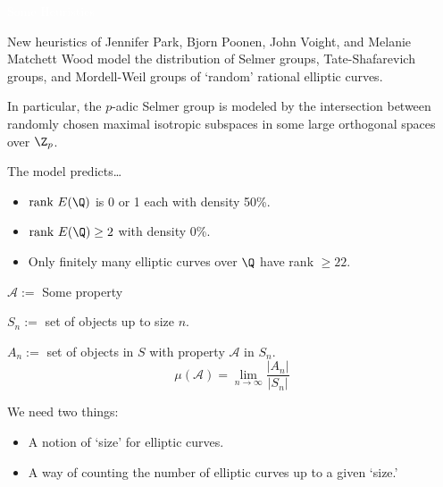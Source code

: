 \begin{frame}{\textcolor{white}{Some Heuristics}}

New heuristics of Jennifer Park, Bjorn Poonen, John Voight, and Melanie Matchett Wood model the distribution of Selmer groups, Tate-Shafarevich groups, and Mordell-Weil groups of `random' rational elliptic curves. \pause \par\vspace{0.3cm}

In particular, the $p$-adic Selmer group is modeled by the intersection between randomly chosen maximal isotropic subspaces in some large orthogonal spaces over $\Z_p$. \pause \par\vspace{0.3cm}

The model predicts\dots \pause
        \begin{itemize}
        \item $\text{rank } E(\Q)$ is 0 or 1 each with density 50\%. \pause
        \item $\text{rank } E(\Q) \geq 2$ with density 0\%. \pause
        \item Only finitely many elliptic curves over $\Q$ have rank $\geq 22$.
        \end{itemize}
\end{frame}



\begin{frame}
\end{frame}



\begin{frame}
\end{frame}



\begin{frame}[plain]
\noindent$\mathcal{A}:=$ Some property \par
\noindent$S_n:=$ set of objects up to size $n$. \par
\noindent$A_n:=$ set of objects in $S$ with property $\mathcal{A}$ in $S_n$. \vspace{1cm}
	\[
	\mu(\mathcal{A})= \lim_{n \to \infty} \dfrac{|A_n|}{|S_n|}
	\]
\end{frame}



\begin{frame}
We need two things: \par\vspace{0.3cm}
	\begin{itemize}
	\item A notion of `size' for elliptic curves. \vspace{0.3cm}
	\item A way of counting the number of elliptic curves up to a given `size.'
	\end{itemize}
\end{frame}


